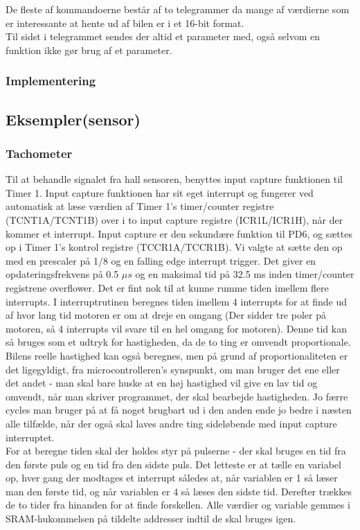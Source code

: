 De fleste af kommandoerne består af to telegrammer da mange af værdierne som er interessante at hente ud af bilen er i et 16-bit format.\\
Til sidst i telegrammet sendes der altid et parameter med, også selvom en funktion ikke gør brug af et parameter.

\subsubsection{Implementering}

\subsection{Eksempler(sensor)}

\subsubsection{Tachometer}

Til at behandle signalet fra hall sensoren, benyttes input capture funktionen til Timer 1. Input capture funktionen har sit eget interrupt og fungerer ved automatisk at læse værdien af Timer 1's timer/counter registre (TCNT1A/TCNT1B) over i to input capture registre (ICR1L/ICR1H), når der kommer et interrupt. Input capture er den sekundære funktion til PD6, og sættes op i Timer 1's kontrol registre (TCCR1A/TCCR1B). Vi valgte at sætte den op med en prescaler på 1/8 og en falling edge interrupt trigger. Det giver en opdateringsfrekvens på 0.5 $\mu s$ og en maksimal tid på 32.5 ms inden timer/counter registrene overflower. Det er fint nok til at kunne rumme tiden imellem flere interrupts. I interruptrutinen beregnes tiden imellem 4 interrupts for at finde ud af hvor lang tid motoren er om at dreje en omgang (Der sidder tre poler på motoren, så 4 interrupts vil svare til en hel omgang for motoren). Denne tid kan så bruges som et udtryk for hastigheden, da de to ting er omvendt proportionale. Bilens reelle hastighed kan også beregnes, men på grund af proportionaliteten er det ligegyldigt, fra microcontrolleren's synspunkt, om man bruger det ene eller det andet - man skal bare huske at en høj hastighed vil give en lav tid og omvendt, når man skriver programmet, der skal bearbejde hastigheden. Jo færre cycles man bruger på at få noget brugbart ud i den anden ende jo bedre i næsten alle tilfælde, når der også skal laves andre ting sideløbende med input capture interruptet.\\
For at beregne tiden skal der holdes styr på pulserne - der skal bruges en tid fra den første puls og en tid fra den sidste puls. Det letteste er at tælle en variabel op, hver gang der modtages et interrupt således at, når variablen er 1 så læser man den første tid, og når variablen er 4 så læses den sidste tid. Derefter trækkes de to tider fra hinanden for at finde forskellen. Alle værdier og variable gemmes i SRAM-hukommelsen på tildelte addresser indtil de skal bruges igen.\\

